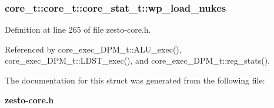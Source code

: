 \subsubsection[{wp\_\-load\_\-nukes}]{ core\_\-t::core\_\-t::core\_\-stat\_\-t::wp\_\-load\_\-nukes}\label{structcore__t_1_1core__stat__t_285541b5146d15da412fb1475e647123}




Definition at line 265 of file zesto-core.h.

Referenced by core\_\-exec\_\-DPM\_\-t::ALU\_\-exec(), core\_\-exec\_\-DPM\_\-t::LDST\_\-exec(), and core\_\-exec\_\-DPM\_\-t::reg\_\-stats().

The documentation for this struct was generated from the following file:\begin{CompactItemize}
\item 
{\bf zesto-core.h}\end{CompactItemize}
